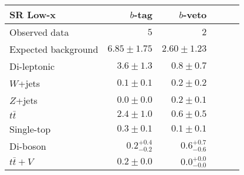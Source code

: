 \begin{tabular*}{\textwidth}{@{\extracolsep{\fill}}lrrrrr}
\toprule
\textbf{SR Low-x} & $b$-tag &  $b$-veto \\
\midrule

Observed data & $5$ & $2$ \\
\midrule
Expected background & $6.85 \pm 1.75$ & $2.60 \pm 1.23$ \\
\midrule
Di-leptonic & $3.6 \pm 1.3$ & $0.8 \pm 0.7$ \\
$W$+jets & $0.1 \pm 0.1$ & $0.2 \pm 0.2$ \\
$Z$+jets & $0.0 \pm 0.0$ & $0.2 \pm 0.1$ \\
$t\bar{t}$ & $2.4 \pm 1.0$ & $0.6 \pm 0.5$ \\
Single-top & $0.3 \pm 0.1$ & $0.1 \pm 0.1$ \\
Di-boson & $0.2_{-0.2}^{+0.4}$ & $0.6_{-0.6}^{+0.7}$ \\
$t\bar{t}+V$ & $0.2 \pm 0.0$ & $0.0_{-0.0}^{+0.0}$ \\


\bottomrule
\end{tabular*}




